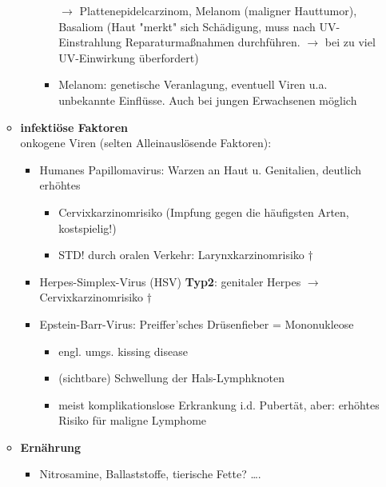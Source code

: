 \begin{itemize}
\begin{itemize}
\begin{itemize}
\begin{itemize}
									\item[$\rightarrow$] Plattenepidelcarzinom, Melanom (maligner Hauttumor), Basaliom (Haut "merkt" sich Schädigung, muss nach UV-Einstrahlung Reparaturmaßnahmen durchführen. $\rightarrow$ bei zu viel UV-Einwirkung überfordert)
									\item Melanom: genetische Veranlagung, eventuell Viren u.a. unbekannte Einflüsse. Auch bei jungen Erwachsenen möglich
								\end{itemize}		  
						\end{itemize}	
					\item \textbf{infektiöse Faktoren}\\
						 onkogene Viren (selten Alleinauslösende Faktoren):
						\begin{itemize}
							\item Humanes Papillomavirus: Warzen an Haut u. Genitalien, deutlich erhöhtes 
								\begin{itemize}
									\item Cervixkarzinomrisiko (Impfung gegen die häufigsten Arten, kostspielig!)
									\item STD! durch oralen Verkehr: Larynxkarzinomrisiko $\dagger$
								\end{itemize}
							\item Herpes-Simplex-Virus (HSV) \textbf{Typ2}: genitaler Herpes $\rightarrow$ Cervixkarzinomrisiko $\dagger$
							\item Epstein-Barr-Virus: Preiffer'sches Drüsenfieber = Mononukleose
								\begin{itemize}
									\item engl. umgs. kissing disease
									\item (sichtbare) Schwellung der Hals-Lymphknoten
									\item meist komplikationslose Erkrankung i.d. Pubertät, aber: erhöhtes Risiko für maligne Lymphome
								\end{itemize}
						\end{itemize}
					\item \textbf{Ernährung}
						\begin{itemize}
							\item Nitrosamine, Ballaststoffe, tierische Fette? ….
						\end{itemize}
				\end{itemize}
		\end{itemize}
